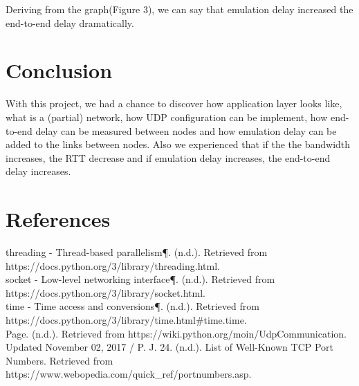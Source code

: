 \documentclass[conference]{IEEEtran}
\begin{document}
Deriving from the graph(Figure 3), we can say that emulation delay increased the end-to-end delay dramatically. 

\section{Conclusion}

With this project, we had a chance to discover how application layer looks like, what is a (partial) network, how UDP configuration can be implement, how end-to-end delay can be measured between nodes and how emulation delay can be added to the links between nodes. Also we experienced that if the the bandwidth increases, the RTT decrease and if emulation delay increases, the end-to-end delay increases.

\section*{References}
     threading - Thread-based parallelism¶. (n.d.). Retrieved from https://docs.python.org/3/library/threading.html. \\
    
     socket - Low-level networking interface¶. (n.d.). Retrieved from https://docs.python.org/3/library/socket.html. \\
    
     time - Time access and conversions¶. (n.d.). Retrieved from https://docs.python.org/3/library/time.html\#time.time. \\
     
     Page. (n.d.). Retrieved from https://wiki.python.org/moin/UdpCommunication. \\
     
     Updated November 02, 2017 / P. J. 24. (n.d.). List of Well-Known TCP Port Numbers. Retrieved from https://www.webopedia.com/quick\_ref/portnumbers.asp.
\end{document}
